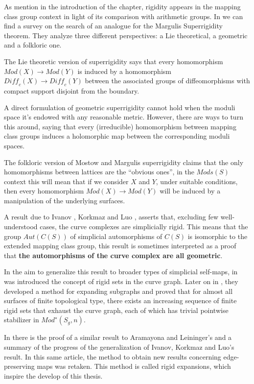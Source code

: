 As mention in the introduction of the chapter, rigidity appears in the mapping class group context in light of its comparison with arithmetic groups. In \cite[Aramayona, S.]{rigidityJA} we can find a survey on the search of an analogue for the Margulis Superrigidity theorem. They analyze three different perspectives: a Lie theoretical, a geometric and a folkloric one.

The Lie theoretic version of superrigidity says that every homomorphism $Mod(X) \to Mod(Y)$ is induced by a homomorphism $\textit{Diff}_{c}(X) \to \textit{Diff}_{c}(Y)$ between the associated groups of diffeomorphisms with compact support disjoint from the boundary.

A direct formulation of geometric superrigidity cannot hold when the moduli space it's endowed with any reasonable metric. However, there are ways to turn this around, saying that every (irreducible) homomorphism between mapping class groups induces a holomorphic map between the corresponding moduli spaces.

The folkloric version of Mostow and Margulis superrigidity claims that the only homomorphisms between lattices are the “obvious ones”, in the $Mods(S)$ context this will mean that if we consider $X$ and $Y$, under suitable conditions, then every homomorphism $Mod(X) \to Mod(Y)$ will be induced by a manipulation of the underlying surfaces. 

A result due to Ivanov \cite{celebratedIvanov}, Korkmaz \cite{celebratedKorkmaz} and Luo \cite{celebratedLuo}, asserts that, excluding few well-understood cases, the curve complexes are simplicially rigid. This means that the group $Aut(C(S))$ of simplicial automorphisms of $C(S)$ is isomorphic to the extended mapping class group, this result is sometimes interpreted as a proof that \textbf{the automorphisms  of  the  curve  complex  are  all geometric}.

In the aim to generalize this result to broader types of simplicial self-maps, in \cite[Aramayona, Leininger - 13]{finiteRigidSetsJA} was introduced the concept of rigid sets in the curve graph. Later on in \cite[Aramayona, Leininger - 13]{exhaustionByRigidSets}, they developed a method for expanding subgraphs and proved that for almost all surfaces of finite topological type, there exists an increasing sequence of finite rigid sets that exhaust the curve graph, each of which has trivial pointwise stabilizer in $Mod^{∗}(S_{g},n)$. 

In \cite[J. Hernández]{exhaustionCurveGraph} there is the proof of a similar result to Aramayona and Leininger's and a summary of the progress of the generalization of Ivanov, Korkmaz and Luo's result. In this same article, the method to obtain new results concerning edge-preserving maps was retaken. This method is called rigid expansions, which inspire the develop of this thesis.

